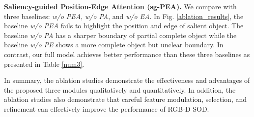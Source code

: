 \documentclass[runningheads]{llncs}
\begin{document}
\noindent
\textbf{Saliency-guided Position-Edge Attention (sg-PEA).} We compare with three baselines: \textit{w/o PEA}, \textit{w/o PA}, and \textit{w/o EA}. In Fig. \ref{ablation_results}, the baseline \textit{w/o PEA} fails to highlight the position and edge of salient object. The baseline \textit{w/o PA} has a sharper boundary of partial complete object while the baseline \textit{w/o PE} shows a more complete object but unclear boundary. In contrast, our full model achieves better performance than these three baselines as presented in Table \ref{num3}.


In summary, the ablation studies demonstrate the effectiveness and advantages of the proposed three modules qualitatively and quantitatively. In addition, the ablation studies also demonstrate that careful feature modulation, selection, and refinement can effectively improve the performance of RGB-D SOD.

\begin{table*}[!t]
	\renewcommand\arraystretch{0.85}
	\caption{Quantitative comparisons of ablated models}
	\begin{center}
	\end{center}
	\label{num3}
\end{table*}
\end{document}
